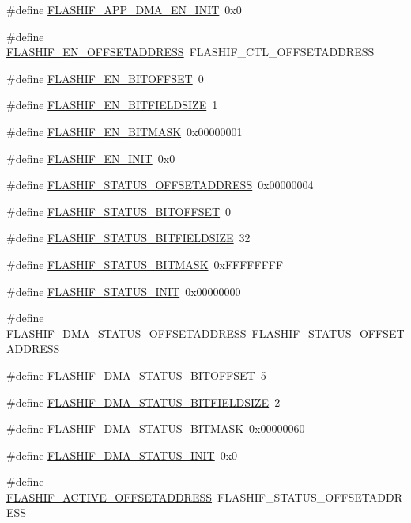 \begin{DoxyCompactItemize}
\#define \hyperlink{a00552_a0a30ac52951a25d6cb8980ac5611877e}{FLASHIF\_\-APP\_\-DMA\_\-EN\_\-INIT}~0x0
\item 
\#define \hyperlink{a00552_a92ff92d363230426f3dadcefacd0a389}{FLASHIF\_\-EN\_\-OFFSETADDRESS}~FLASHIF\_\-CTL\_\-OFFSETADDRESS
\item 
\#define \hyperlink{a00552_aa8a0166da83198a9edc90ae56fb61e21}{FLASHIF\_\-EN\_\-BITOFFSET}~0
\item 
\#define \hyperlink{a00552_a0717c22ac1f7a4dcd691fed4cc3b88a7}{FLASHIF\_\-EN\_\-BITFIELDSIZE}~1
\item 
\#define \hyperlink{a00552_a5e932232eb2112a9f49acde3fe403900}{FLASHIF\_\-EN\_\-BITMASK}~0x00000001
\item 
\#define \hyperlink{a00552_ad785336a83104d6977950080c449350d}{FLASHIF\_\-EN\_\-INIT}~0x0
\item 
\#define \hyperlink{a00552_a69707dd942590f44c002bd64f7fa66ed}{FLASHIF\_\-STATUS\_\-OFFSETADDRESS}~0x00000004
\item 
\#define \hyperlink{a00552_a08bcfdf4d30cfa32adbb4d3018ef05ea}{FLASHIF\_\-STATUS\_\-BITOFFSET}~0
\item 
\#define \hyperlink{a00552_a8cf77b56f72c94b7c7c781e736ac318b}{FLASHIF\_\-STATUS\_\-BITFIELDSIZE}~32
\item 
\#define \hyperlink{a00552_af8ce5b4d7b6ef0d8a45bce09f2614d55}{FLASHIF\_\-STATUS\_\-BITMASK}~0xFFFFFFFF
\item 
\#define \hyperlink{a00552_a3fb5305fdb58e57ab8d6c4d7d8c3dc41}{FLASHIF\_\-STATUS\_\-INIT}~0x00000000
\item 
\#define \hyperlink{a00552_ae475cdd25c64de082be253a489350e56}{FLASHIF\_\-DMA\_\-STATUS\_\-OFFSETADDRESS}~FLASHIF\_\-STATUS\_\-OFFSETADDRESS
\item 
\#define \hyperlink{a00552_a8ae0d58c739920f7e24cc1d9fc283b8d}{FLASHIF\_\-DMA\_\-STATUS\_\-BITOFFSET}~5
\item 
\#define \hyperlink{a00552_a7a2e5548d3a08ce68b729043d6399828}{FLASHIF\_\-DMA\_\-STATUS\_\-BITFIELDSIZE}~2
\item 
\#define \hyperlink{a00552_a6171ed7e9bd7dc6e9c6abaf3faa5aa6f}{FLASHIF\_\-DMA\_\-STATUS\_\-BITMASK}~0x00000060
\item 
\#define \hyperlink{a00552_ad6d1e1ac7be4e5618e48c30785b8898e}{FLASHIF\_\-DMA\_\-STATUS\_\-INIT}~0x0
\item 
\#define \hyperlink{a00552_a6dc2390c705ca25c29b0506bc1ad5268}{FLASHIF\_\-ACTIVE\_\-OFFSETADDRESS}~FLASHIF\_\-STATUS\_\-OFFSETADDRESS
\item 

\end{DoxyCompactItemize}
